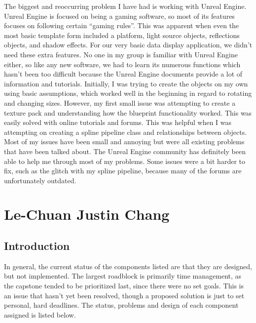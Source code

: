 \documentclass[onecolumn, draftclsnofoot, 10pt, compsoc]{IEEEtran}
\begin{document}
\begin{singlespace}
The biggest and reoccurring problem I have had is working with Unreal Engine. Unreal Engine is focused on being a gaming software, so most of its features focuses on following certain “gaming rules”. This was apparent when even the most basic template form included a platform, light source objects, reflections objects, and shadow effects. For our very basic data display application, we didn't need these extra features. No one in my group is familiar with Unreal Engine either, so like any new software, we had to learn its numerous functions which hasn't been too difficult because the Unreal Engine documents provide a lot of information and tutorials. 
Initially, I was trying to create the objects on my own using basic assumptions, which worked well in the beginning in regard to rotating and changing sizes. However, my first small issue was attempting to create a texture pack and understanding how the blueprint functionality worked. This was easily solved with online tutorials and forums. This was helpful when I was attempting on creating a spline pipeline class and relationships between objects. Most of my issues have been small and annoying but were all existing problems that have been talked about. The Unreal Engine community has definitely been able to help me through most of my problems. Some issues were a bit harder to fix, such as the glitch with my spline pipeline, because many of the forums are unfortunately outdated. 
\end{singlespace}
\section{Le-Chuan Justin Chang}
\subsection{Introduction}
\begin{singlespace}
In general, the current status of the components listed are that they are designed, but not implemented. The largest roadblock is primarily time management, as the capstone tended to be prioritized last, since there were no set goals. This is an issue that hasn't yet been resolved, though a proposed solution is just to set personal, hard deadlines. The status, problems and design of each component assigned is listed below.
\end{singlespace}
\end{document}
